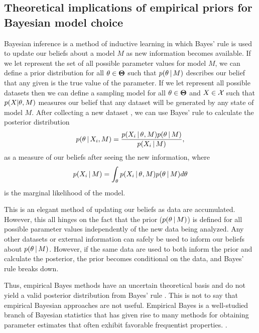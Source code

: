 \subsection{Theoretical implications of empirical priors for Bayesian model
choice}
\begin{linenomath}
Bayesian inference is a method of inductive learning in which Bayes' rule is
used to update our beliefs about a model $M$ as new information becomes
available.
If we let \allParameterValues represent the set of all possible parameter
values for model $M$, we can define a prior distribution for all $\theta \in
\boldsymbol{\Theta}$ such that $p(\theta \,|\, M)$ describes our belief that
any given \myTheta{} is the true value of the parameter.
If we let \allDatasets represent all possible datasets then we can 
define a sampling model for all $\theta \in
\boldsymbol{\Theta}$ and $\alignment{}{} \in \allDatasets$ such that
$p(\alignment{}{} | \theta, M)$ measures our belief that any dataset \alignment{}{}
will be generated by any state \myTheta{} of model $M$.
After collecting a new dataset , we can use Bayes' rule to
calculate the posterior distribution
\begin{equation}
    p(\myTheta{} \given \alignment{i}{}, M) = \frac{p(\alignment{i}{} \given
    \myTheta{}, M)p(\myTheta{} \given M)}{p(\alignment{i}{} \given M)},
    \label{eq:bayesrule}
\end{equation}
as a measure of our beliefs after seeing the new information, where
\begin{equation}
    p(\alignment{i}{} \given M) = \int_{\myTheta{}} p(\alignment{i}{} \given
    \myTheta{}, M)p(\myTheta{} \given M) d\myTheta{}
    \label{eq:marginallikelhiood}
\end{equation}
is the marginal likelihood of the model.
\end{linenomath}

This is an elegant method of updating our beliefs as data are accumulated.
However, this all hinges on the fact that the prior ($p(\theta_{} \,|\, M)$)
is defined for all possible parameter values independently of the new data
being analyzed.
Any other datasets or external information can safely be used to inform our
beliefs about $p(\theta_{} \,|\, M)$.
However, if the same data are used to both inform the prior and calculate the
posterior, the prior becomes conditional on the data, and Bayes' rule breaks
down.

Thus, empirical Bayes methods have an uncertain theoretical basis and
do not yield a valid posterior distribution from Bayes' rule \citep[e.g.,
empirical Bayesian estimates of the posterior are often too narrow, off-center,
and incorrectly shaped;][]{Morris1983,Laird1987,Carlin1990,Efron2013}.
This is not to say that empirical Bayesian approaches are not useful.
Empirical Bayes is a well-studied branch of Bayesian statistics that has given
rise to many methods for obtaining parameter estimates that often
exhibit favorable frequentist properties.
\citep{Morris1983,Laird1987,Laird1989, Carlin1990,Hwang2009}.

